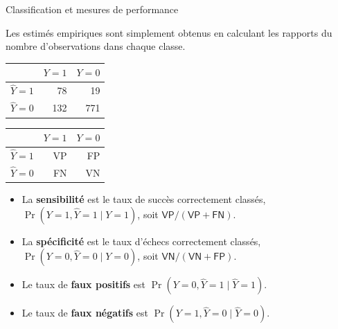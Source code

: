 \documentclass[
  ignorenonframetext,
]{beamer}
\providecommand{\tightlist}{%
  \setlength{\itemsep}{0pt}\setlength{\parskip}{0pt}}\usepackage{longtable,booktabs,array}
\begin{document}
\begin{frame}{Classification et mesures de performance}
\protect\hypertarget{classification-et-mesures-de-performance}{}
\footnotesize

Les estimés empiriques sont simplement obtenus en calculant les rapports
du nombre d'observations dans chaque classe.

\normalsize

\begin{table}

\begin{tabular}{lrr}
\toprule
  & \(Y=1\) & \(Y=0\)\\
\midrule
\(\widehat{Y}=1\) & 78 & 19\\
\(\widehat{Y}=0\) & 132 & 771\\
\bottomrule
\end{tabular}
\begin{tabular}{lrr}
\toprule
  & \(Y=1\) & \(Y=0\)\\
\midrule
\(\widehat{Y}=1\) & VP & FP\\
\(\widehat{Y}=0\) & FN & VN\\
\bottomrule
\end{tabular}
\end{table}

\begin{itemize}
\tightlist
\item
  La \textbf{sensibilité} est le taux de succès correctement classés,
  \(\Pr(Y=1, \widehat{Y}=1 \mid Y=1)\), soit
  \(\mathsf{VP}/(\mathsf{VP}+\mathsf{FN})\).
\item
  La \textbf{spécificité} est le taux d'échecs correctement classés,
  \(\Pr(Y=0, \widehat{Y}=0 \mid Y=0)\), soit
  \(\mathsf{VN}/(\mathsf{VN}+\mathsf{FP})\).
\item
  Le taux de \textbf{faux positifs} est
  \(\Pr(Y=0, \widehat{Y}=1 \mid \widehat{Y}=1)\).
\item
  Le taux de \textbf{faux négatifs} est
  \(\Pr(Y=1, \widehat{Y}=0 \mid \widehat{Y}=0)\).
\end{itemize}
\end{frame}
\end{document}
